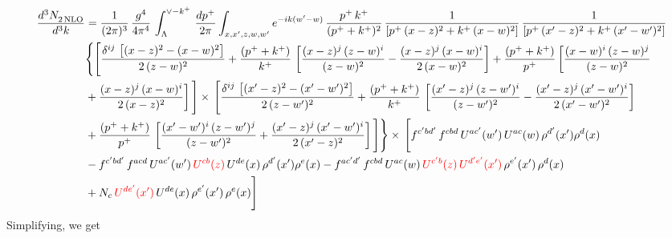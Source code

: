 \documentclass[9pt]{article}
\numberwithin{equation}{section}
\begin{document}
\begin{align}
    \frac{d^{3}N_{2\,\rm NLO}^{\rm}}{d^{3}k}  & = \frac{1}{(2\pi)^{3}}\, \frac{g^{4}}{4\pi^{4}}\,\int_{\Lambda}^{\vee-k^{+}}\, \frac{dp^{+}}{2\pi}\int_{x,x',z,w,w^{\prime}} e^{-ik(w^{\prime}-w)}\,\frac{p^{+}\,k^{+}}{(p^{+}+k^{+})^{2}}\, \frac{1}{\left[p^{+}\,(x-z)^{2}+k^{+}\,(x-w)^{2}\right]}\,\frac{1}{\left[p^{+}\,(x'-z)^{2}+k^{+}\,(x'-w')^{2}\right]}\notag \\ & \Bigg\{\Bigg[\frac{\delta^{ij}\, \left[(x-z)^{2}-(x-w)^{2}\right]}{2\,(z-w)^{2}} + \frac{(p^{+}+k^{+})}{k^{+}}\, \left[\frac{(x-z)^{j}\,(z-w)^{i}}{(z-w)^{2}}-\frac{(x-z)^{j}\,(x-w)^{i}}{2\,(x-w)^{2}}\right]+\frac{(p^{+}+k^{+})}{p^{+}}\,\bigg[\frac{(x-w)^{i}\,(z-w)^{j}}{(z-w)^{2}}\notag \\ & +\frac{(x-z)^{j}\,(x-w)^{i}}{2\,(x-z)^{2}}\bigg]\,\Bigg]\times\, \Bigg[\frac{\delta^{ij}\, \left[(x'-z)^{2}-(x'-w')^{2}\right]}{2\,(z-w')^{2}}+ \frac{(p^{+}+k^{+})}{k^{+}}\, \left[\frac{(x'-z)^{j}\,(z-w')^{i}}{(z-w')^{2}}-\frac{(x'-z)^{j}\,(x'-w')^{i}}{2\,(x'-w')^{2}}\right]\notag \\ & +\frac{(p^{+}+k^{+})}{p^{+}}\,\left[\frac{(x'-w')^{i}\,(z-w')^{j}}{(z-w')^{2}} +\frac{(x'-z)^{j}\,(x'-w')^{i}}{2\,(x'-z)^{2}}\right] \Bigg] \Bigg\} \times\,  \Bigg[f^{c'bd'}\,f^{cbd}\, U^{ac'}(w')\,U^{ac}(w)\,\rho^{d'}(x')\rho^{d}(x)\notag \\ & - f^{c'bd'}\,f^{acd}\,U^{ac'}(w')\,{\color{red}U^{cb}(z)}\,U^{de}(x)\,\rho^{d'}(x')\rho^{e}(x) -f^{ac'd'}\,f^{cbd}\,U^{ac}(w)\,{\color{red}U^{c'b}(z)\,U^{d'e'}(x')}\,\rho^{e'}(x')\,\rho^{d}(x)\notag \\ & +N_{c}\,{\color{red}U^{de'}(x')}\,U^{de}(x)\,\rho^{e'}(x')\,\rho^{e}(x)\Bigg]
\end{align}
Simplifying, we get
\end{document}
